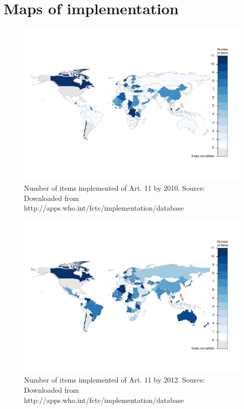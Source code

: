 \documentclass[10pt]{article}
\begin{document}
\section{Maps of implementation}

\begin{landscape}
\begin{figure}[H]
\centering
\includegraphics[width=.95\linewidth]{../fig/implementation_art11_map2010.pdf}
\caption{Number of items implemented of Art. 11 by 2010. Source: Downloaded
from http://apps.who.int/fctc/implementation/database}
\end{figure}

\begin{figure}[H]
\centering
\includegraphics[width=.95\linewidth]{../fig/implementation_art11_map2012.pdf}
\caption{Number of items implemented of Art. 11 by 2012. Source: Downloaded
from http://apps.who.int/fctc/implementation/database}
\end{figure}

\end{landscape}
\end{document}
